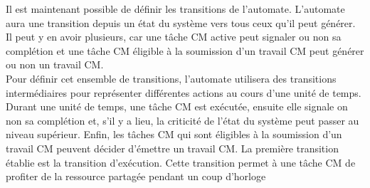 \documentclass[12pt,a4paper,oneside]{book}
\theoremstyle{break}
\theoremstyle{breakplain}
\begin{document}
Il est maintenant possible de définir les transitions de l'automate. L'automate aura une transition depuis un état du système vers tous ceux qu'il peut générer. Il peut y en avoir plusieurs, car une tâche CM active peut signaler ou non sa complétion et une tâche CM éligible à la soumission d'un travail CM peut générer ou non un travail CM.\\

Pour définir cet ensemble de transitions, l'automate utilisera des transitions intermédiaires pour représenter différentes actions au cours d'une unité de temps.\\
Durant une unité de temps, une tâche CM est exécutée, ensuite elle signale on non sa complétion et, s'il y a lieu, la criticité de l'état du système peut passer au niveau supérieur. Enfin, les tâches CM qui sont éligibles à la soumission d'un travail CM peuvent décider d'émettre un travail CM.
La première transition établie est la transition d'exécution. Cette transition permet à une tâche CM de profiter de la ressource partagée pendant un coup d'horloge
\end{document}
